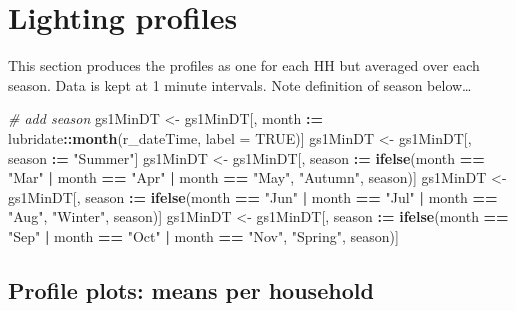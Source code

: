 \documentclass[]{article}
\newenvironment{Shaded}{\begin{snugshade}}{\end{snugshade}}
\newcommand{\KeywordTok}[1]{\textcolor[rgb]{0.13,0.29,0.53}{\textbf{#1}}}
\newcommand{\DataTypeTok}[1]{\textcolor[rgb]{0.13,0.29,0.53}{#1}}
\newcommand{\StringTok}[1]{\textcolor[rgb]{0.31,0.60,0.02}{#1}}
\newcommand{\CommentTok}[1]{\textcolor[rgb]{0.56,0.35,0.01}{\textit{#1}}}
\newcommand{\OtherTok}[1]{\textcolor[rgb]{0.56,0.35,0.01}{#1}}
\newcommand{\OperatorTok}[1]{\textcolor[rgb]{0.81,0.36,0.00}{\textbf{#1}}}
\newcommand{\ErrorTok}[1]{\textcolor[rgb]{0.64,0.00,0.00}{\textbf{#1}}}
\newcommand{\NormalTok}[1]{#1}
\begin{document}
\section{Lighting profiles}\label{lighting-profiles}

This section produces the profiles as one for each HH but averaged over
each season. Data is kept at 1 minute intervals. Note definition of
season below\ldots{}

\begin{Shaded}
\begin{Highlighting}[]
\CommentTok{# add season}
\NormalTok{gs1MinDT <-}\StringTok{ }\NormalTok{gs1MinDT[, month }\OperatorTok{:}\ErrorTok{=}\StringTok{ }\NormalTok{lubridate}\OperatorTok{::}\KeywordTok{month}\NormalTok{(r_dateTime, }\DataTypeTok{label =} \OtherTok{TRUE}\NormalTok{)]}
\NormalTok{gs1MinDT <-}\StringTok{ }\NormalTok{gs1MinDT[, season }\OperatorTok{:}\ErrorTok{=}\StringTok{ "Summer"}\NormalTok{]}
\NormalTok{gs1MinDT <-}\StringTok{ }\NormalTok{gs1MinDT[, season }\OperatorTok{:}\ErrorTok{=}\StringTok{ }\KeywordTok{ifelse}\NormalTok{(month }\OperatorTok{==}\StringTok{ "Mar"} \OperatorTok{|}
\StringTok{                                              }\NormalTok{month }\OperatorTok{==}\StringTok{ "Apr"} \OperatorTok{|}
\StringTok{                                              }\NormalTok{month }\OperatorTok{==}\StringTok{ "May"}\NormalTok{, }\StringTok{"Autumn"}\NormalTok{, season)]}
\NormalTok{gs1MinDT <-}\StringTok{ }\NormalTok{gs1MinDT[, season }\OperatorTok{:}\ErrorTok{=}\StringTok{ }\KeywordTok{ifelse}\NormalTok{(month }\OperatorTok{==}\StringTok{ "Jun"} \OperatorTok{|}
\StringTok{                                              }\NormalTok{month }\OperatorTok{==}\StringTok{ "Jul"} \OperatorTok{|}
\StringTok{                                              }\NormalTok{month }\OperatorTok{==}\StringTok{ "Aug"}\NormalTok{, }\StringTok{"Winter"}\NormalTok{, season)]}
\NormalTok{gs1MinDT <-}\StringTok{ }\NormalTok{gs1MinDT[, season }\OperatorTok{:}\ErrorTok{=}\StringTok{ }\KeywordTok{ifelse}\NormalTok{(month }\OperatorTok{==}\StringTok{ "Sep"} \OperatorTok{|}
\StringTok{                                              }\NormalTok{month }\OperatorTok{==}\StringTok{ "Oct"} \OperatorTok{|}
\StringTok{                                              }\NormalTok{month }\OperatorTok{==}\StringTok{ "Nov"}\NormalTok{, }\StringTok{"Spring"}\NormalTok{, season)]}
\end{Highlighting}
\end{Shaded}

\subsection{Profile plots: means per
household}\label{profile-plots-means-per-household}
\end{document}
